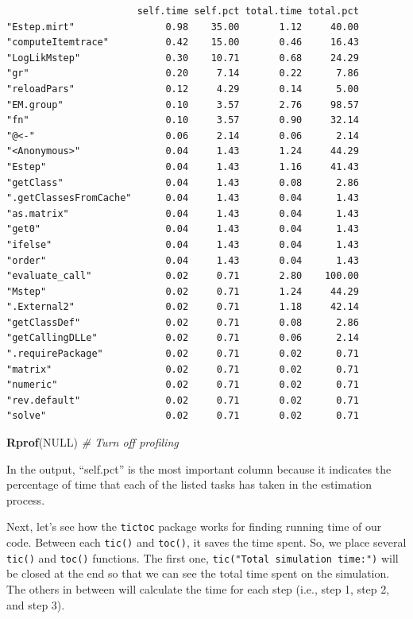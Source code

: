 \documentclass[
]{book}
\newenvironment{Shaded}{\begin{snugshade}}{\end{snugshade}}
\newcommand{\CommentTok}[1]{\textcolor[rgb]{0.56,0.35,0.01}{\textit{#1}}}
\newcommand{\KeywordTok}[1]{\textcolor[rgb]{0.13,0.29,0.53}{\textbf{#1}}}
\newcommand{\NormalTok}[1]{#1}
\newcommand{\OtherTok}[1]{\textcolor[rgb]{0.56,0.35,0.01}{#1}}
\begin{document}
\begin{verbatim}
                       self.time self.pct total.time total.pct
"Estep.mirt"                0.98    35.00       1.12     40.00
"computeItemtrace"          0.42    15.00       0.46     16.43
"LogLikMstep"               0.30    10.71       0.68     24.29
"gr"                        0.20     7.14       0.22      7.86
"reloadPars"                0.12     4.29       0.14      5.00
"EM.group"                  0.10     3.57       2.76     98.57
"fn"                        0.10     3.57       0.90     32.14
"@<-"                       0.06     2.14       0.06      2.14
"<Anonymous>"               0.04     1.43       1.24     44.29
"Estep"                     0.04     1.43       1.16     41.43
"getClass"                  0.04     1.43       0.08      2.86
".getClassesFromCache"      0.04     1.43       0.04      1.43
"as.matrix"                 0.04     1.43       0.04      1.43
"get0"                      0.04     1.43       0.04      1.43
"ifelse"                    0.04     1.43       0.04      1.43
"order"                     0.04     1.43       0.04      1.43
"evaluate_call"             0.02     0.71       2.80    100.00
"Mstep"                     0.02     0.71       1.24     44.29
".External2"                0.02     0.71       1.18     42.14
"getClassDef"               0.02     0.71       0.08      2.86
"getCallingDLLe"            0.02     0.71       0.06      2.14
".requirePackage"           0.02     0.71       0.02      0.71
"matrix"                    0.02     0.71       0.02      0.71
"numeric"                   0.02     0.71       0.02      0.71
"rev.default"               0.02     0.71       0.02      0.71
"solve"                     0.02     0.71       0.02      0.71
\end{verbatim}

\begin{Shaded}
\begin{Highlighting}[]
\KeywordTok{Rprof}\NormalTok{(}\OtherTok{NULL}\NormalTok{) }\CommentTok{# Turn off profiling}
\end{Highlighting}
\end{Shaded}

In the output, ``self.pct'' is the most important column because it indicates the percentage of time that each of the listed tasks has taken in the estimation process.

Next, let's see how the \texttt{tictoc} package works for finding running time of our code. Between each \texttt{tic()} and \texttt{toc()}, it saves the time spent. So, we place several \texttt{tic()} and \texttt{toc()} functions. The first one, \texttt{tic("Total\ simulation\ time:")} will be closed at the end so that we can see the total time spent on the simulation. The others in between will calculate the time for each step (i.e., step 1, step 2, and step 3).
\end{document}
